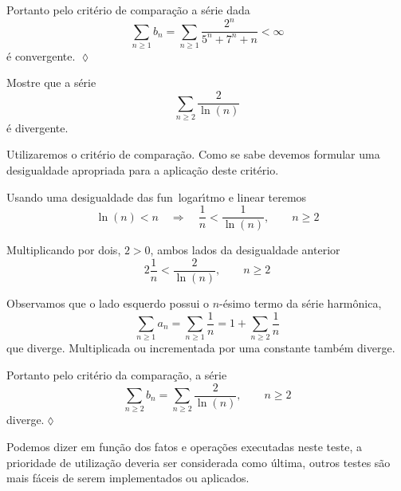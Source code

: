 Portanto pelo crit\'{e}rio de compara\c{c}\~{a}o a s\'{e}rie dada
\begin{equation*}
 \sum_{n\ge 1}b_n=\sum_{n\ge 1}\frac{2^n}{5^n+7^n+n}<\infty
\end{equation*}
 \'{e} convergente. \hfill \(\lozenge\)

\begin{exer}
Mostre que a s\'{e}rie
\begin{equation*}
    \sum_{n\ge 2}\frac{2}{\ln(n)}
\end{equation*}
\'{e} divergente.
\end{exer}

\solo Utilizaremos o crit\'{e}rio de compara\c{c}\~{a}o. Como se sabe devemos
formular uma desigualdade apropriada para a aplica\c{c}\~{a}o deste
crit\'{e}rio.

Usando uma desigualdade das fun\coes\ logar\'{\i}tmo e linear teremos
\begin{equation*}
    \ln(n)<n\quad \Rightarrow\quad \frac{1}{n}<\frac{1}{\ln(n)},\qquad
    n\ge 2
\end{equation*}

Multiplicando por dois, $2>0$, ambos lados da desigualdade anterior
\begin{equation*}
    2\frac{1}{n}<\frac{2}{\ln(n)},\qquad n\ge 2
\end{equation*}

Observamos que o lado esquerdo possui o $n$-\'{e}simo termo da s\'{e}rie
harm\^{o}nica,
\begin{equation*}
    \sum_{n\ge 1}a_n=\sum_{n\ge 1}\frac{1}{n}=1+\sum_{n\ge 2}\frac{1}{n}
\end{equation*}
que diverge. Multiplicada ou incrementada por uma constante tamb\'{e}m
diverge.

Portanto pelo crit\'{e}rio da compara\c{c}\~{a}o, a s\'{e}rie
\begin{equation*}
    \sum_{n\ge 2}b_n=\sum_{n\ge 2}\frac{2}{\ln(n)},\qquad n\ge 2
\end{equation*}
diverge.\hfill \(\lozenge\)


\begin{obs}
Podemos dizer em fun\c{c}\~{a}o dos fatos e opera\c{c}\~{o}es executadas neste
teste, a prioridade de utiliza\c{c}\~{a}o deveria ser considerada como
\'{u}ltima, outros testes s\~{a}o mais f\'{a}ceis de serem implementados ou
aplicados.
\end{obs}


